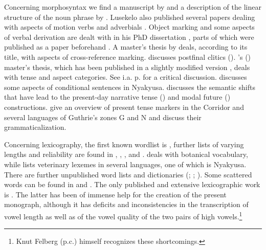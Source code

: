 Concerning morphosyntax we find a manuscript by \citet{DurantiA1977} and a description of the linear structure of the noun phrase by \citet{LusekeloA2009a}. Lusekelo also published several papers dealing with aspects of motion verbs \citep{LusekeloA2008} and adverbials \citep{LusekeloA2010}. Object marking and some aspects of verbal derivation are dealt with in his PhD dissertation \citep{LusekeloA2012}, parts of which were published as a paper beforehand \citep{LusekeloA2008a}. A master's thesis by \citet{HawkinsonA1976} deals, according to its title, with aspects of cross-reference marking. \citet{PersohnB2017a} discusses postfinal clitics (). \mbox{\citeauthor{LusekeloA2007}'s} (\citeyear{LusekeloA2007}) master's thesis, which has been published in a slightly modified version \citep{LusekeloA2013}, deals with tense and aspect categories. See i.a. p.\nobreakspace\pageref{FootnoteCriticismLusekelo2013} for a critical discussion. \citet{LusekeloA2016} discusses some aspects of conditional sentences in Nyakyusa. \citet{PersohnB2016} discusses the semantic shifts that have lead to the present-day narrative tense () and modal future () constructions. \citet{PersohnBBernanderR2016} give an overview of present tense markers in the Corridor and several languages of Guthrie's zones G and N and discuss their grammaticalization.

\largerpage
Concerning lexicography, the first known wordlist is \citet{BainJ1891}, further lists of varying lengths and reliability are found in \citet{JohnstonH1897,JohnstonH1977}, \citet{NurseD1979}, \citet{SchumannK1899}, \citet{MerenskyA1894} and \citet{MwangokaNVoorhoeveJ1960c}. \citet{StolzA1934} deals with botanical vocabulary, while \citet{GreenwayP1947} lists veterinary lexemes in several languages, one of which is Nyakyusa. There are further unpublished word lists and dictionaries (\citealt{Anonym1939}; \citealt{BusseJnd}; \citealt{Konter-KataniM1988}). Some scattered words can be found in \citet{WernerA1919} and \citet{WilsonM1958}. The only published and extensive lexicographic work is \citet{FelbergK1996}. The latter has been of immense help for the creation of the present monograph, although it has deficits and inconsistencies in the transcription of vowel length as well as of the vowel quality of the two pairs of high vowels.\footnote{Knut Felberg (p.c.) himself recognizes these shortcomings.} 

